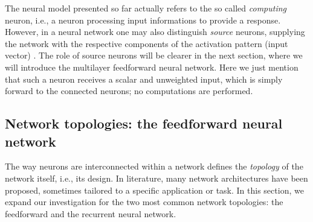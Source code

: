 \documentclass[12pt, a4paper, twoside, openright]{report}
\numberwithin{equation}{chapter}
\theoremstyle{theorem}
\theoremstyle{definition}
\theoremstyle{remark}
\theoremstyle{proposition}
\numberwithin{figure}{chapter}
\begin{document}
		\vspace*{0.3cm}
		
		The neural model presented so far actually refers to the so called \emph{computing} neuron, i.e., a neuron processing input informations to provide a response. However, in a neural network one may also distinguish \emph{source} neurons, supplying the network with the respective components of the activation pattern (input vector) \cite{Hay05}. The role of source neurons will be clearer in the next section, where we will introduce the multilayer feedforward neural network. Here we just mention that such a neuron receives a scalar and unweighted input, which is simply forward to the connected neurons; no computations are performed.
		
	\vspace*{0.3cm}
		
	\subsection{Network topologies: the feedforward neural network}
	\label{section:Network topologies}
			
		The way neurons are interconnected within a network defines the \emph{topology} of the network itself, i.e., its design. In literature, many network architectures have been proposed, sometimes tailored to a specific application or task. In this section, we expand our investigation for the two most common network topologies: the feedforward and the recurrent neural network.
		
\end{document}
